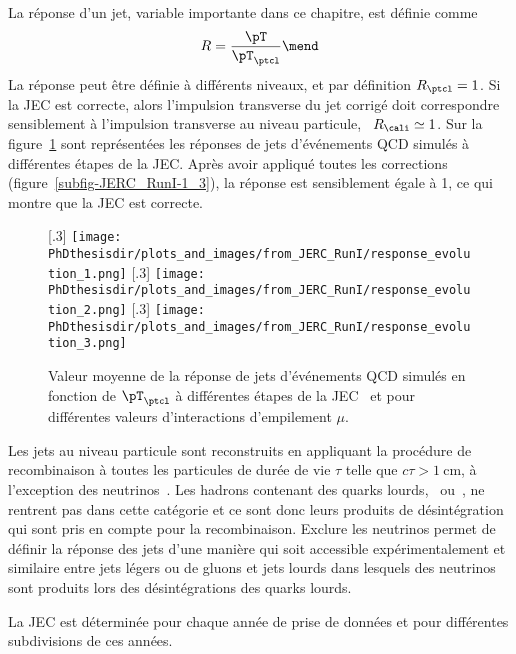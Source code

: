 La réponse d'un jet, variable importante dans ce chapitre, est définie comme
\begin{equation}
R = \frac{\pT}{\pT_\ptcl}
\mend
\label{eq-def_R_jet}
\end{equation}
La réponse peut être définie à différents niveaux, et par définition $R_\ptcl=1$.
Si la JEC est correcte, alors l'impulsion transverse du jet corrigé doit correspondre sensiblement à l'impulsion transverse au niveau particule, \ie\ $R_\cali\simeq1$.
Sur la figure~\ref{fig-JERC_RunI-1} sont représentées les réponses de jets d'événements QCD simulés à différentes étapes de la JEC. Après avoir appliqué toutes les corrections (figure~\ref{subfig-JERC_RunI-1_3}), la réponse est sensiblement égale à 1, ce qui montre que la JEC est correcte.
\begin{figure}[h]
\centering
{}[.3\textwidth]
{\texttt{[image: \\PhDthesisdir/plots\_and\_images/from\_JERC\_RunI/response\_evolution\_1.png]}}
\hfill
{}[.3\textwidth]
{\texttt{[image: \\PhDthesisdir/plots\_and\_images/from\_JERC\_RunI/response\_evolution\_2.png]}}
\hfill
{}[.3\textwidth]
{\texttt{[image: \\PhDthesisdir/plots\_and\_images/from\_JERC\_RunI/response\_evolution\_3.png]}}
\caption[Valeur moyenne de la réponse de jets d'événements QCD simulés.]{Valeur moyenne de la réponse de jets d'événements QCD simulés en fonction de $\pT_\ptcl$ à différentes étapes de la JEC~\cite{JERC_RunI} et pour différentes valeurs d'interactions d'empilement $\mu$.}
\label{fig-JERC_RunI-1}
\end{figure}
\par Les jets au niveau particule sont reconstruits en appliquant la procédure de recombinaison à toutes les particules de durée de vie $\tau$ telle que $c\tau>\SI{1}{\centi\meter}$, à l'exception des neutrinos~\cite{JERC_RunI}.
Les hadrons contenant des quarks lourds, \quarkc\ ou~\quarkb, ne rentrent pas dans cette catégorie et ce sont donc leurs produits de désintégration qui sont pris en compte pour la recombinaison.
Exclure les neutrinos permet de définir la réponse des jets d'une manière qui soit
accessible expérimentalement
et
similaire entre jets légers ou de gluons et jets lourds
dans lesquels des neutrinos sont produits lors des désintégrations des quarks lourds.
\par La JEC est déterminée pour chaque année de prise de données et pour différentes subdivisions de ces années.
